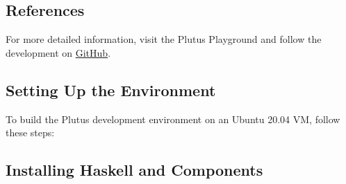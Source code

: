 \subsection{References}
For more detailed information, visit the Plutus Playground and follow the development on \href{https://github.com/input-output-hk/plutus}{GitHub}.


\subsection{Setting Up the Environment}

To build the Plutus development environment on an Ubuntu 20.04 VM, follow these steps:

\subsection{Installing Haskell and Components}


